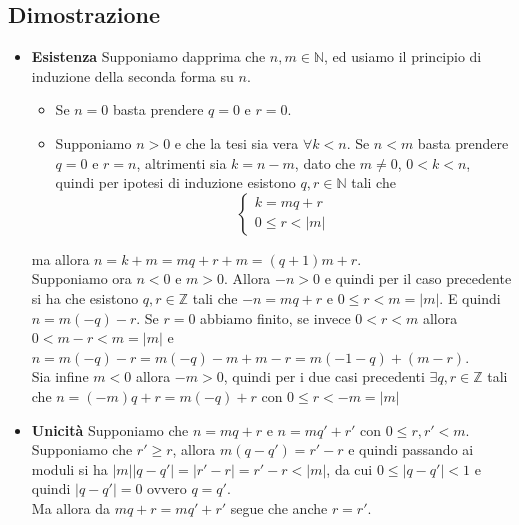 \documentclass[a4paper,12pt]{article}
\begin{document}
\subsection*{Dimostrazione}
\begin{itemize}
	\item \textbf{Esistenza} Supponiamo dapprima che $n, m \in \mathbb{N}$, ed usiamo il principio di induzione della seconda forma su $n$.
		\begin{itemize}
			\item Se $n = 0$ basta prendere $q = 0$ e $r = 0$.
			\item Supponiamo $n > 0$ e che la tesi sia vera $\forall k < n$. Se $n < m$ basta prendere $q = 0$ e $r = n$, altrimenti sia $k = n - m$, dato che $m\neq 0$, $0 < k < n$, quindi per ipotesi di induzione esistono $q, r \in \mathbb{N}$ tali che
			\[ \begin{cases}
				k = mq + r \\
				0 \leq r < |m|
			\end{cases} \]
		\end{itemize}
		ma allora $n = k + m = mq + r + m = (q + 1)m + r$. \\
		Supponiamo ora $n < 0$ e $m > 0$. Allora $-n > 0$ e quindi per il caso precedente si ha che esistono $q, r \in \mathbb{Z}$ tali che $-n = mq + r$ e $0 \leq r < m = |m|$. E quindi $n = m(-q) - r$. Se $r = 0$ abbiamo finito, se invece $0 < r < m$ allora $0 < m - r < m = |m|$ e $n = m(-q) - r = m(-q) -m +m -r = m(-1 -q) + (m-r)$.\\
		Sia infine $m < 0$ allora $-m > 0$, quindi per i due casi precedenti $\exists q, r \in \mathbb{Z}$ tali che $n = (-m)q + r = m(-q) + r$ con $0 \leq r < -m = |m|$
	\item \textbf{Unicità} Supponiamo che $n = mq + r$ e $n = mq' + r'$ con $0 \leq r, r' < m$. \\
		Supponiamo che $r' \geq r$, allora $m(q - q') = r' - r$ e quindi passando ai moduli si ha $|m||q - q'| = |r' - r| = r' - r < |m|$, da cui $0 \leq |q - q'| < 1$ e quindi $|q - q'| = 0$ ovvero $q = q'$.\\
		Ma allora da $mq + r = mq' + r'$ segue che anche $r = r'$.
\end{itemize}

\printindex
\end{document}
